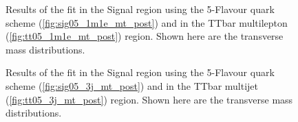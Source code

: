 \begin{figure}[htb]
\center
{}
\caption{Results of the fit in the Signal region using the 5-Flavour quark scheme (\ref{fig:sig05_1m1e_mt_post})
 and in the TTbar multilepton (\ref{fig:tt05_1m1e_mt_post}) region.
 Shown here are the transverse mass distributions.}
\label{fig:postfits_Wbb5F_1m1e}
\end{figure}

\begin{figure}[htb]
\center
{}
\caption{Results of the fit in the Signal region using the 5-Flavour quark scheme (\ref{fig:sig05_3j_mt_post})
 and in the TTbar multijet (\ref{fig:tt05_3j_mt_post}) region.
 Shown here are the transverse mass distributions.}
\label{fig:postfits_Wbb5F_3j}
\end{figure}

